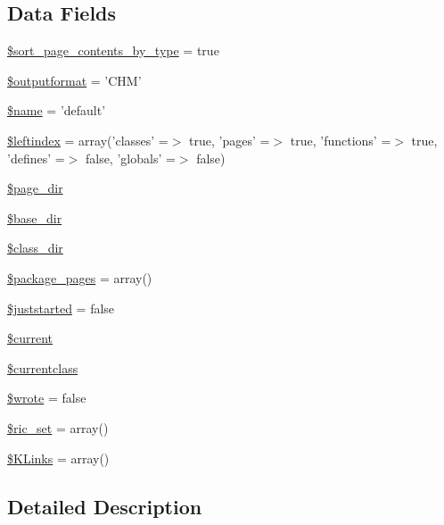 \subsection*{\-Data \-Fields}
\begin{DoxyCompactItemize}
\item 
\hyperlink{class_c_h_mdefault_converter_ab5dae87e1968b35e37687a763216a835}{\$sort\-\_\-page\-\_\-contents\-\_\-by\-\_\-type} = true
\item 
\hyperlink{class_c_h_mdefault_converter_af0bfe153c049d957e8ea29b147025108}{\$outputformat} = '\-C\-H\-M'
\item 
\hyperlink{class_c_h_mdefault_converter_ab2fc40d43824ea3e1ce5d86dee0d763b}{\$name} = 'default'
\item 
\hyperlink{class_c_h_mdefault_converter_ab49669c749559bb7833762878adb8f0c}{\$leftindex} = array('classes' =$>$ true, 'pages' =$>$ true, 'functions' =$>$ true, 'defines' =$>$ false, 'globals' =$>$ false)
\item 
\hyperlink{class_c_h_mdefault_converter_ab554c658003c5e2653580ba881cd50eb}{\$page\-\_\-dir}
\item 
\hyperlink{class_c_h_mdefault_converter_aa36f57c62963507498e1181f9a75bbb9}{\$base\-\_\-dir}
\item 
\hyperlink{class_c_h_mdefault_converter_aaeaa82d379050faafbb4bf4b82733c94}{\$class\-\_\-dir}
\item 
\hyperlink{class_c_h_mdefault_converter_acb916db0304b969918dbc0de762d45e0}{\$package\-\_\-pages} = array()
\item 
\hyperlink{class_c_h_mdefault_converter_acb00e2d25525278b0592bfffe53bc4b6}{\$juststarted} = false
\item 
\hyperlink{class_c_h_mdefault_converter_a2c4c58e377f6c66ca38c8ea97666fc5e}{\$current}
\item 
\hyperlink{class_c_h_mdefault_converter_a14f3ccc5fc24cdb94ee022a77ef69c4d}{\$currentclass}
\item 
\hyperlink{class_c_h_mdefault_converter_a2cf37faa5637b7639b816f3e61485a30}{\$wrote} = false
\item 
\hyperlink{class_c_h_mdefault_converter_a84e3c5e32f1d02114c9d126d5864d06b}{\$ric\-\_\-set} = array()
\item 
\hyperlink{class_c_h_mdefault_converter_ad9819bdc26ee59da811d4fb7d012c532}{\$\-K\-Links} = array()
\end{DoxyCompactItemize}


\subsection{\-Detailed \-Description}


